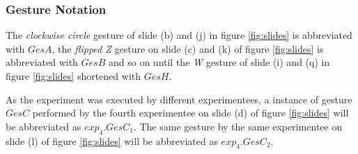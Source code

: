 \subsubsection{Gesture Notation} \label{gesture_notation}
The \textit{clockwise circle} gesture of slide (b) and (j) in figure \ref{fig:slides} is abbreviated with $GesA$, the
\textit{flipped Z} gesture on slide (c) and (k) of figure \ref{fig:slides} is abbreviated with $GesB$ and so on until
the \textit{W} gesture of slide (i) and (q) in figure \ref{fig:slides} shortened with $GesH$.

As the experiment was executed by different experimentees, a instance of gesture $GesC$ performed by the fourth
experimentee on slide (d) of figure \ref{fig:slides} will be abbreviated as $exp_{4}.GesC_{1}$. The same gesture by the
same experimentee on slide (l) of figure \ref{fig:slides} will be abbreviated as $exp_{4}.GesC_{2}$.
